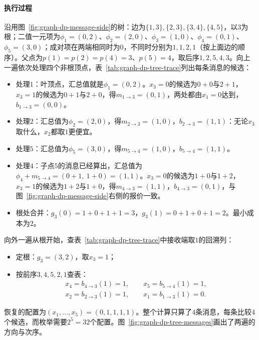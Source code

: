 \paragraph{执行过程}
沿用图~\ref{fig:graph-dp-message-side}的树：边为$\{1,3\},\allowbreak\{2,3\},\allowbreak\{3,4\},\allowbreak\{4,5\}$，以$3$为根；二值一元项为$\phi_1=(0,2)$、$\phi_2=(2,0)$、$\phi_3=(1,0)$、$\phi_4=(0,1)$、$\phi_5=(3,0)$；成对项在两端相同时为$0$，不同时分别为$1,1,2,1$（按上面边的顺序）。父点为$p(1)=p(2)=p(4)=3$、$p(5)=4$，取后序$1,2,5,4,3$。向上一遍依次处理四个非根顶点，表~\ref{tab:graph-dp-tree-trace}列出每条消息的候选：
\begin{itemize}
  \item 处理$1$：叶顶点，汇总值就是$\phi_1=(0,2)$。$x_3=0$的候选为$0+0$与$2+1$，$x_3=1$的候选为$0+1$与$2+0$，得$m_{1\to3}=(0,1)$，两处都由$x_1=0$达到，$b_{1\to3}=(0,0)$。
  \item 处理$2$：汇总值为$\phi_2=(2,0)$，得$m_{2\to3}=(1,0)$，$b_{2\to3}=(1,1)$：无论$x_3$取什么，$x_2$都取$1$更便宜。
  \item 处理$5$：汇总值为$\phi_5=(3,0)$，得$m_{5\to4}=(1,0)$，$b_{5\to4}=(1,1)$。
  \item 处理$4$：子点$5$的消息已经算出，汇总值为$\phi_4+m_{5\to4}=(0+1,\ 1+0)=(1,1)$。$x_3=0$的候选为$1+0$与$1+2$，$x_3=1$的候选为$1+2$与$1+0$，得$m_{4\to3}=(1,1)$，$b_{4\to3}=(0,1)$，与图~\ref{fig:graph-dp-message-side}右侧的报价一致。
  \item 根处合并：$g_3(0)=1+0+1+1=3$，$g_3(1)=0+1+0+1=2$。最小成本为$2$。
\end{itemize}
向外一遍从根开始，查表~\ref{tab:graph-dp-tree-trace}中接收端取$1$的回溯列：
\begin{itemize}
  \item 定根：$g_3=(3,2)$，取$x_3=1$；
  \item 按前序$3,4,5,2,1$查表：
  \[
  \begin{gathered}
  x_4=b_{4\to3}(1)=1,\qquad x_5=b_{5\to4}(1)=1,\\
  x_2=b_{2\to3}(1)=1,\qquad x_1=b_{1\to3}(1)=0.
  \end{gathered}
  \]
\end{itemize}
恢复的配置为$(x_1,\ldots,x_5)=(0,1,1,1,1)$。整个计算只算了$4$条消息，每条比较$4$个候选，而枚举需要$2^5=32$个配置。图~\ref{fig:graph-dp-tree-messages}画出了两遍的方向与次序。

